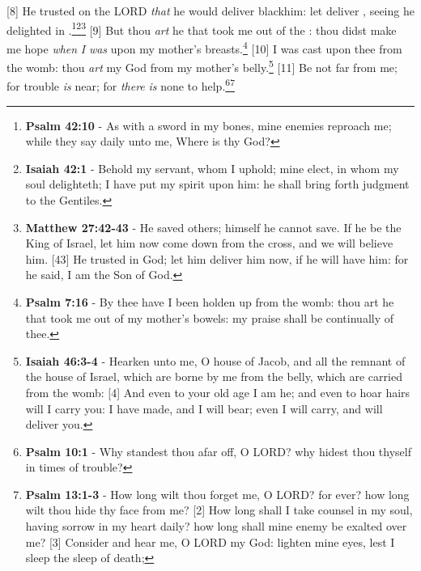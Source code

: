 [8] \textcolor[cmyk]{0.99998,1,0,0}{He trusted on the LORD \emph{that} he would deliver black{him}: let  deliver , seeing he delighted in .}\footnote{\textbf{Psalm 42:10} - As with a sword in my bones, mine enemies reproach me; while they say daily unto me, Where is thy God?}\footnote{\textbf{Isaiah 42:1} - Behold my servant, whom I uphold; mine elect, in whom my soul delighteth; I have put my spirit upon him: he shall bring forth judgment to the Gentiles.}\footnote{\textbf{Matthew 27:42-43} - He saved others; himself he cannot save. If he be the King of Israel, let him now come down from the cross, and we will believe him. [43] He trusted in God; let him deliver him now, if he will have him: for he said, I am the Son of God.}
[9] \textcolor[cmyk]{0.99998,1,0,0}{But thou \emph{art} he that took me out of the : thou didst make me hope \emph{when} \emph{I} \emph{was} upon my mother's breasts.}\footnote{\textbf{Psalm 7:16} - By thee have I been holden up from the womb: thou art he that took me out of my mother's bowels: my praise shall be continually of thee.}
[10] \textcolor[cmyk]{0.99998,1,0,0}{I was cast upon thee from the womb: thou \emph{art} my God from my mother's belly.}\footnote{\textbf{Isaiah 46:3-4} - Hearken unto me, O house of Jacob, and all the remnant of the house of Israel, which are borne by me from the belly, which are carried from the womb: [4] And even to your old age I am he; and even to hoar hairs will I carry you: I have made, and I will bear; even I will carry, and will deliver you.}
[11] \textcolor[cmyk]{0.99998,1,0,0}{Be not far from me; for trouble \emph{is} near; for \emph{there} \emph{is} none to help.}\footnote{\textbf{Psalm 10:1} - Why standest thou afar off, O LORD? why hidest thou thyself in times of trouble?}\footnote{\textbf{Psalm 13:1-3} - How long wilt thou forget me, O LORD? for ever? how long wilt thou hide thy face from me? [2] How long shall I take counsel in my soul, having sorrow in my heart daily? how long shall mine enemy be exalted over me? [3] Consider and hear me, O LORD my God: lighten mine eyes, lest I sleep the sleep of death;}
